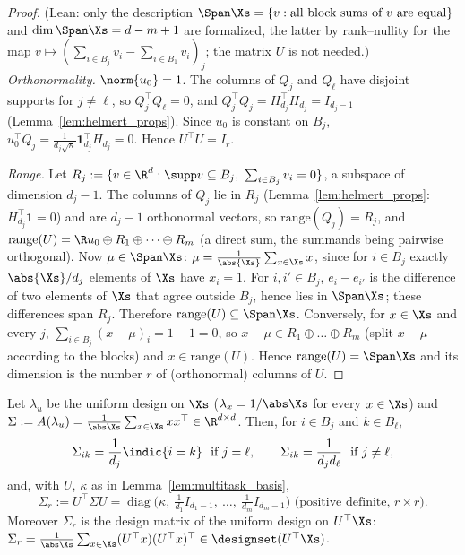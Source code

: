 \begin{proof}
(Lean: only the description $\Span\Xs = \{v : \text{all block sums of } v \text{ are equal}\}$
and $\dim\Span\Xs = d - m + 1$ are formalized, the latter by rank--nullity for the map
$v \mapsto (\sum_{i\in B_j}v_i - \sum_{i\in B_1}v_i)_j$; the matrix $U$ is not needed.)
\emph{Orthonormality.} $\norm{u_0} = 1$. The columns of $Q_j$ and $Q_\ell$ have disjoint
supports for $j \ne \ell$, so $Q_j^\top Q_\ell = 0$, and $Q_j^\top Q_j = H_{d_j}^\top H_{d_j} = I_{d_j-1}$
(Lemma~\ref{lem:helmert_props}). Since $u_0$ is constant on $B_j$,
$u_0^\top Q_j = \frac{1}{d_j\sqrt\kappa}\mathbf 1_{d_j}^\top H_{d_j} = 0$. Hence $U^\top U = I_r$.

\emph{Range.} Let $R_j := \{v \in \R^d : \supp v \subseteq B_j,\ \sum_{i\in B_j}v_i = 0\}$,
a subspace of dimension $d_j - 1$. The columns of $Q_j$ lie in $R_j$
(Lemma~\ref{lem:helmert_props}: $H_{d_j}^\top\mathbf 1 = 0$) and are $d_j - 1$ orthonormal
vectors, so $\mathrm{range}(Q_j) = R_j$, and
$\mathrm{range}(U) = \R u_0 \oplus R_1\oplus\dots\oplus R_m$ (a direct sum, the summands being
pairwise orthogonal). Now $\mu \in \Span\Xs$: $\mu = \frac{1}{\abs{\Xs}}\sum_{x\in\Xs}x$,
since for $i \in B_j$ exactly $\abs{\Xs}/d_j$ elements of $\Xs$ have $x_i = 1$. For
$i, i' \in B_j$, $e_i - e_{i'}$ is the difference of two elements of $\Xs$ that agree
outside $B_j$, hence lies in $\Span\Xs$; these differences span $R_j$. Therefore
$\mathrm{range}(U) \subseteq \Span\Xs$. Conversely, for $x \in \Xs$ and every $j$,
$\sum_{i\in B_j}(x - \mu)_i = 1 - 1 = 0$, so $x - \mu \in R_1\oplus\dots\oplus R_m$ (split
$x - \mu$ according to the blocks) and $x \in \mathrm{range}(U)$. Hence
$\mathrm{range}(U) = \Span\Xs$ and its dimension is the number $r$ of (orthonormal) columns
of $U$.
\end{proof}

\begin{lemma}\label{lem:multitask_design_cov}
\leanok
{}
Let $\lambda_u$ be the uniform design on $\Xs$ ($\lambda_x = 1/\abs\Xs$ for every
$x \in \Xs$) and $\Sigma := A(\lambda_u) = \frac{1}{\abs\Xs}\sum_{x\in\Xs}xx^\top \in \R^{d\times d}$.
Then, for $i \in B_j$ and $k \in B_\ell$,
\[
  \Sigma_{ik} = \frac{1}{d_j}\indic\{i = k\} \ \text{ if } j = \ell, \qquad
  \Sigma_{ik} = \frac{1}{d_jd_\ell} \ \text{ if } j \ne \ell ,
\]
and, with $U$, $\kappa$ as in Lemma~\ref{lem:multitask_basis},
\[
  \Sigma_r := U^\top\Sigma U = \operatorname{diag}\Big(\kappa,\ \tfrac{1}{d_1}I_{d_1-1},\ \dots,\ \tfrac{1}{d_m}I_{d_m-1}\Big)  \text{ (positive definite, } r\times r) .
\]
Moreover $\Sigma_r$ is the design matrix of the uniform design on $U^\top\Xs$:
$\Sigma_r = \frac{1}{\abs\Xs}\sum_{x\in\Xs}(U^\top x)(U^\top x)^\top \in \designset(U^\top\Xs)$.
\end{lemma}

